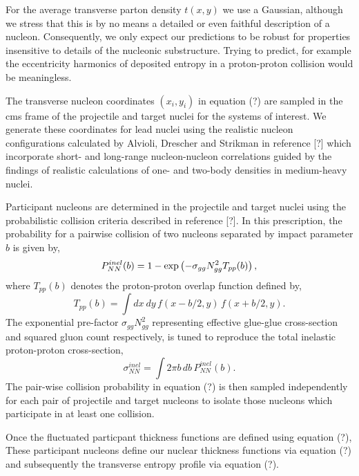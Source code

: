 \documentclass[aps,prl,reprint,amsmath,nofootinbib]{revtex4-1}
\begin{document}
For the average transverse parton density $t(x,y)$ we use a Gaussian, although we stress that this is by no means a detailed or even faithful description of a nucleon.
Consequently, we only expect our predictions to be robust for properties insensitive to details of the nucleonic substructure. Trying to predict, for example the 
eccentricity harmonics of deposited entropy in a proton-proton collision would be meaningless. 

The transverse nucleon coordinates $(x_i,y_i)$ in equation (?) are sampled in the cms frame of the projectile and target nuclei for the systems of interest. We generate
these coordinates for lead nuclei using the realistic nucleon configurations calculated by Alvioli, Drescher and Strikman in reference [?] which incorporate short- 
and long-range nucleon-nucleon correlations guided by the findings of realistic calculations of one- and two-body densities in medium-heavy nuclei.

Participant nucleons are determined in the projectile and target nuclei using the probabilistic collision criteria described in reference [?]. In this prescription, the 
probability for a pairwise collision of two nucleons separated by impact parameter $b$ is given by,
\begin{equation}
  P^{inel}_{NN}(b) = 1 - \exp \left(-\sigma_{gg} N_{gg}^2 T_{pp}(b) \right), \\[1ex]
\end{equation}
where $T_{pp}(b)$ denotes the proton-proton overlap function defined by,
\begin{equation}
 T_{pp}(b) = \int dx~dy \,f(x-b/2,y) \,f(x+b/2,y).
\end{equation}
The exponential pre-factor $\sigma_{gg} N_{gg}^2$ representing effective glue-glue cross-section and squared gluon count respectively, is tuned to reproduce the total inelastic proton-proton cross-section,
\begin{equation}
  \sigma^{inel}_{NN} = \int 2 \pi b \,db \, P_{NN}^{inel}(b).
\end{equation}
The pair-wise collision probability in equation (?) is then sampled independently for each pair of projectile and target nucleons to isolate those nucleons which 
participate in at least one collision. 

Once the fluctuated particpant thickness functions are defined using equation (?),
These participant nucleons define our nuclear thickness functions via equation (?) and subsequently the transverse entropy profile via equation (?).
\end{document}
